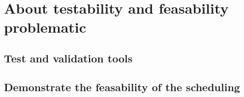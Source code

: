 
\chapter{About testability and feasability problematic}
\doMinitoc

\section{Test and validation tools}

\section{Demonstrate the feasability of the scheduling}

